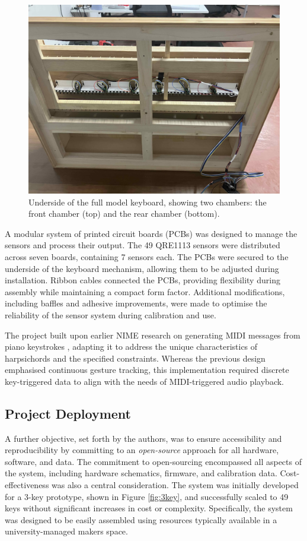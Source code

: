 \begin{figure}  
  \centering
  \includegraphics[width=\linewidth]{src/images/49-key-bottom-sensors-no-keys.jpg} 
  \caption{Underside of the full model keyboard, showing two chambers: the front chamber (top) and the rear chamber (bottom).} 
  \Description{} 
  \label{fig:49-key-bottom}
\end{figure}

A modular system of printed circuit boards (PCBs) was designed to manage the sensors and process their output. The 49 QRE1113 sensors were distributed across seven boards, containing 7 sensors each. The PCBs were secured to the underside of the keyboard mechanism, allowing them to be adjusted during installation. Ribbon cables connected the PCBs, providing flexibility during assembly while maintaining a compact form factor. Additional modifications, including baffles and adhesive improvements, were made to optimise the reliability of the sensor system during calibration and use.


The project built upon earlier NIME research on generating MIDI messages from piano keystrokes \cite{McPherson2013}, adapting it to address the unique characteristics of harpsichords and the specified constraints. Whereas the previous design emphasised continuous gesture tracking, this implementation required discrete key-triggered data to align with the needs of MIDI-triggered audio playback. 

\subsection{Project Deployment}
A further objective, set forth by the authors, was to ensure accessibility and reproducibility by committing to an \emph{open-source} approach for all hardware, software, and data. The commitment to open-sourcing encompassed all aspects of the system, including hardware schematics, firmware, and calibration data. Cost-effectiveness was also a central consideration. The system was initially developed for a 3-key prototype, shown in Figure \ref{fig:3key}, and successfully scaled to 49 keys without significant increases in cost or complexity. Specifically, the system was designed to be easily assembled using resources typically available in a university-managed makers space.


